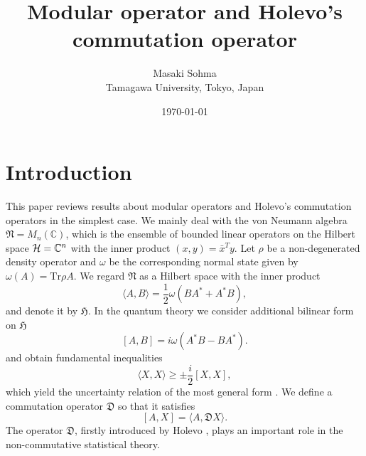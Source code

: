 \documentclass{article}
\begin{document}
\title{Modular operator and Holevo's commutation operator}


 \author{Masaki Sohma
\\
Tamagawa University, Tokyo, Japan}


\date{\today}



\maketitle




\section{Introduction}
This paper reviews results about  modular operators \cite{Longo_1978} and  Holevo's commutation operators \cite{Holevo_1977} in the simplest case.
We mainly deal with the von Neumann algebra $\mathfrak{N}=M_n(\mathbb{C})$, 
which is the ensemble of bounded linear operators on 
the Hilbert space ${\cal H}=\mathbb{C}^{n}$ with the inner product $(x,y)=\bar{x}^Ty$. 
Let $\rho$ be a non-degenerated density operator and 
$\omega$ be the corresponding normal state given by $\omega(A)=\mbox{Tr}\rho A$.
We regard $\mathfrak{N}$ as a Hilbert space with the inner product
\begin{equation}
\label{innerP}
\langle A, B \rangle =\frac{1}{2}\omega(BA^{\ast}+A^{\ast}B),
\end{equation}
and denote it by $\mathfrak{H}$.
In the quantum theory we consider additional bilinear form on $\mathfrak{H}$ 
\begin{equation}\label{Bform}
[A,B]=i\omega(A^{\ast}B-BA^{\ast}).
\end{equation}
and  obtain fundamental inequalities 
$$
\langle X, X\rangle \geq \pm \frac{i}{2}[X,X],
$$
which yield  the uncertainty relation of the most general form \cite{Holevo_1977}.
We define a commutation operator $\mathfrak{D}$ so that it satisfies 
\begin{equation}\label{Copr}
[A,X]=\langle A, \mathfrak{D}X\rangle.
\end{equation}
The operator $\mathfrak{D}$, firstly introduced by Holevo \cite{Holevo_1977}, plays an important role in the non-commutative statistical theory.  
\end{document}
